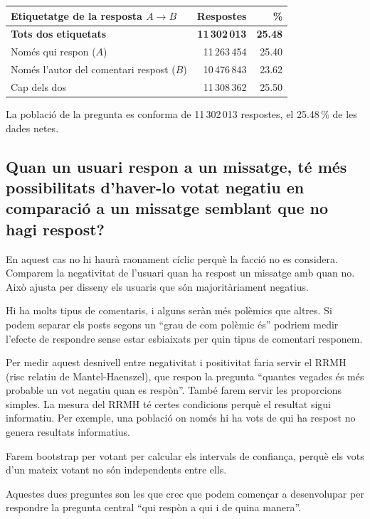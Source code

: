 \documentclass[11pt,a4paper]{article}
\begin{document}
\begin{center}
\begin{tabular}{@{}lrr@{}}
\toprule
\textbf{Etiquetatge de la resposta $A \to B$} & \textbf{Respostes} & \textbf{\%} \\
\midrule
\textbf{Tots dos etiquetats} & \textbf{11\,302\,013} & \textbf{25.48} \\
Només qui respon ($A$) & 11\,263\,454 & 25.40 \\
Només l'autor del comentari respost ($B$) & 10\,476\,843 & 23.62 \\
Cap dels dos & 11\,308\,362 & 25.50 \\
\bottomrule
\end{tabular}
\end{center}

La població de la pregunta es conforma de 11\,302\,013 respostes, el 25.48\,\% de les dades netes.

\subsection{Quan un usuari respon a un missatge, té més possibilitats d'haver-lo votat negatiu en comparació a un missatge semblant que no hagi respost?}

En aquest cas no hi haurà raonament cíclic perquè la facció no es considera. Comparem la negativitat de l'usuari quan ha respost un missatge amb quan no. Això ajusta per disseny els usuaris que són majoritàriament negatius.

Hi ha molts tipus de comentaris, i alguns seràn més polèmics que altres. Si podem separar els posts segons un ``grau de com polèmic és'' podriem medir l'efecte de respondre sense estar esbiaixats per quin tipus de comentari responem.

Per medir aquest desnivell entre negativitat i positivitat faria servir el RRMH (risc relatiu de Mantel-Haenszel), que respon la pregunta ``quantes vegades és més probable un vot negatiu quan es respòn''. També farem servir les proporcions simples. La mesura del RRMH té certes condicions perquè el resultat sigui informatiu. Per exemple, una població on només hi ha vots de qui ha respost no genera resultats informatius.

Farem bootstrap per votant per calcular els intervals de confiança, perquè els vots d'un mateix votant no són independents entre ells.

Aquestes dues preguntes son les que crec que podem començar a desenvolupar per respondre la pregunta central ``qui respòn a qui i de quina manera''.
\end{document}

